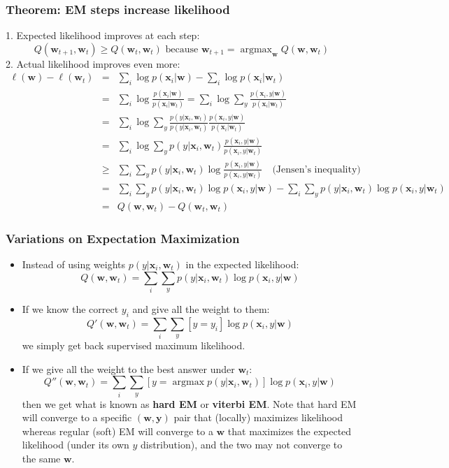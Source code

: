 \documentclass[ignorenonframetext,plain,fleqn]{beamer}
\DeclareMathOperator*{\argmax}{argmax}
\renewcommand{\vec}{\mathbf}
\begin{document}
\begin{frame}\frametitle{Theorem: EM steps increase likelihood}
1. Expected likelihood improves at each step:
\[ Q(\vec{w}_{t+1},\vec{w}_t) \geq Q(\vec{w}_t,\vec{w}_t)
\text{ because }
\vec{w}_{t+1} = \argmax_\vec{w} Q(\vec{w},\vec{w}_t) \]
2. Actual likelihood improves even more: \scriptsize
\begin{eqnarray*}
\ell(\vec{w})-\ell(\vec{w}_t)
&=& \sum_i \log p(\vec{x}_i|\vec{w}) 
- \sum_i \log p(\vec{x}_i|\vec{w}_t)
\\ &=& \sum_i \log \frac{p(\vec{x}_i|\vec{w})}{p(\vec{x}_i|\vec{w}_t)} 
= \sum_i \log \sum_y \frac{p(\vec{x}_i,y|\vec{w})}{p(\vec{x}_i|\vec{w}_t)} 
\\ &=& \sum_i \log \sum_y \frac{p(y|\vec{x}_i,\vec{w}_t)}{p(y|\vec{x}_i,\vec{w}_t)}
\frac{p(\vec{x}_i,y|\vec{w})}{p(\vec{x}_i|\vec{w}_t)} 
\\ &=& \sum_i \log \sum_y p(y|\vec{x}_i,\vec{w}_t)
\frac{p(\vec{x}_i,y|\vec{w})}{p(\vec{x}_i,y|\vec{w}_t)} 
\\ &\geq& \sum_i \sum_y p(y|\vec{x}_i,\vec{w}_t)
\log \frac{p(\vec{x}_i,y|\vec{w})}{p(\vec{x}_i,y|\vec{w}_t)} 
\quad\text{(Jensen's inequality)}
\\ &=& \sum_i \sum_y p(y|\vec{x}_i,\vec{w}_t)\log p(\vec{x}_i,y|\vec{w}) 
- \sum_i \sum_y p(y|\vec{x}_i,\vec{w}_t)\log p(\vec{x}_i,y|\vec{w}_t) 
\\ &=& Q(\vec{w},\vec{w}_t) - Q(\vec{w}_t,\vec{w}_t)
\end{eqnarray*}
\end{frame}

\begin{frame}\frametitle{Variations on Expectation Maximization}
\begin{itemize}
\item Instead of using weights $p(y|\vec{x}_i,\vec{w}_t)$ in the
  expected likelihood:
\[ Q(\vec{w},\vec{w}_t) = \sum_i \sum_y p(y|\vec{x}_i,\vec{w}_t) \log p(\vec{x}_i, y | \vec{w}) \]
\item If we know the correct $y_i$ and give all the weight to them:
\[ Q'(\vec{w},\vec{w}_t) = \sum_i \sum_y [y=y_i] \log p(\vec{x}_i, y | \vec{w}) \]
we simply get back supervised maximum likelihood.
\item If we give all the weight to the best answer under $\vec{w}_t$:
\[ Q''(\vec{w},\vec{w}_t) = \sum_i \sum_y [y=\argmax p(y|\vec{x}_i,\vec{w}_t)] 
\log p(\vec{x}_i, y | \vec{w}) \] then we get what is known as {\bf
  hard EM} or {\bf viterbi EM}.  Note that hard EM will converge to a
specific $(\vec{w}, \vec{y})$ pair that (locally) maximizes likelihood
whereas regular (soft) EM will converge to a $\vec{w}$ that maximizes
the expected likelihood (under its own $y$ distribution), and the two
may not converge to the same $\vec{w}$.
\end{itemize}
\end{frame}
\end{document}
